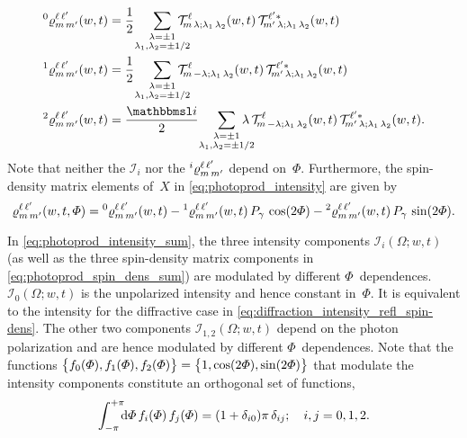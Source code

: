 \begin{align}
  \label{eq:photoprod_rho_0}
  \prescript{0}{}{\varrho}^{\ell\, \ell'}_{m\, m'}(w, t)
  ={}& \frac{1}{2}\quad \sum_{\substack{\lambda = \pm 1 \\ \mathclap{\lambda_1, \lambda_2 = \pm 1/2}}}
  \mathcal{T}^\ell_{\!m\, \lambda; \lambda_1\, \lambda_2}(w, t)\,
  \mathcal{T}^{\ell' *}_{\!m'\, \lambda; \lambda_1\, \lambda_2}(w, t)
  \\
  \label{eq:photoprod_rho_1}
  \prescript{1}{}{\varrho}^{\ell\, \ell'}_{m\, m'}(w, t)
  ={}& \frac{1}{2}\quad \sum_{\substack{\lambda = \pm 1 \\ \mathclap{\lambda_1, \lambda_2 = \pm 1/2}}}
  \mathcal{T}^\ell_{\!m\, {-\lambda}; \lambda_1\, \lambda_2}(w, t)\,
  \mathcal{T}^{\ell' *}_{\!m'\, \lambda; \lambda_1\, \lambda_2}(w, t)
  \\
  \label{eq:photoprod_rho_2}
  \prescript{2}{}{\varrho}^{\ell\, \ell'}_{m\, m'}(w, t)
  ={}& \frac{\imag}{2}\quad \sum_{\substack{\lambda = \pm 1 \\ \mathclap{\lambda_1, \lambda_2 = \pm 1/2}}}
  \lambda\,
  \mathcal{T}^\ell_{\!m\, {-\lambda}; \lambda_1\, \lambda_2}(w, t)\,
  \mathcal{T}^{\ell' *}_{\!m'\, \lambda; \lambda_1\, \lambda_2}(w, t).
\end{align}
Note that neither the $\mathcal{I}_i$ nor the
$\prescript{i}{}{\varrho}^{\ell\, \ell'}_{m\, m'}$ depend on~$\Phi$.
Furthermore, the spin-density matrix elements of~$X$ in
\cref{eq:photoprod_intensity} are given by
\begin{equation}
  \label{eq:photoprod_spin_dens_sum}
  \varrho^{\ell\, \ell'}_{m\, m'}(w, t, \Phi)
  = \prescript{0}{}{\varrho}^{\ell\, \ell'}_{m\, m'}(w, t)
  - \prescript{1}{}{\varrho}^{\ell\, \ell'}_{m\, m'}(w, t)\, P_\gamma\, \cos(2 \Phi)
  - \prescript{2}{}{\varrho}^{\ell\, \ell'}_{m\, m'}(w, t)\, P_\gamma\, \sin(2 \Phi).
\end{equation}

In \cref{eq:photoprod_intensity_sum}, the three intensity components
$\mathcal{I}_i(\Omega; w, t)$ (as well as the three spin-density
matrix components in \cref{eq:photoprod_spin_dens_sum}) are modulated
by different $\Phi$~dependences.  $\mathcal{I}_0(\Omega; w, t)$ is the
unpolarized intensity and hence constant in~$\Phi$.  It is equivalent
to the intensity for the diffractive case in
\cref{eq:diffraction_intensity_refl_spin-dens}.  The other two
components $\mathcal{I}_{1, 2}(\Omega; w, t)$ depend on the photon
polarization and are hence modulated by different $\Phi$~dependences.
Note that the functions $\cBrk[1]{f_0(\Phi), f_1(\Phi), f_2(\Phi)} =
\cBrk[1]{1, \cos(2 \Phi), \sin(2 \Phi)}$ that modulate the intensity
components constitute an orthogonal set of functions, \ie
\begin{equation}
  \label{eq:photoprod_orthogonality_phi}
  \int_{-\pi}^{+\pi}\!\!\! \dif{\Phi}\, f_i(\Phi)\, f_j(\Phi)
  = (1 + \delta_{i 0}) \pi\, \delta_{i j};
  \quad i, j = 0 ,1, 2.
\end{equation}

